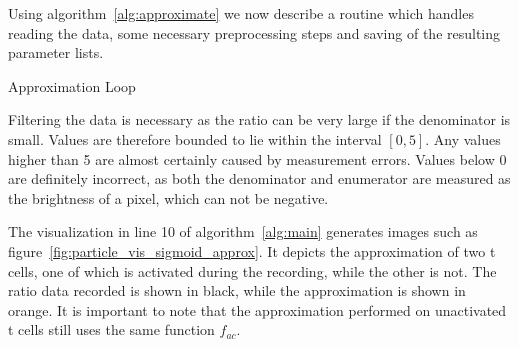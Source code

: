 Using algorithm~\ref{alg:approximate} we now describe a routine which handles reading the data, some necessary preprocessing steps and saving of the resulting parameter lists.
\newpage

\begin{algorithm}[H] \label{alg:main}
	\SetAlgoLined
	\DontPrintSemicolon
	\LinesNumbered
	\caption{Approximation Loop}
	
	
	\BlankLine
\end{algorithm}
\vspace{1cm}

Filtering the data is necessary as the ratio can be very large if the denominator is small. Values are therefore bounded to lie within the interval $[0, 5]$. Any values higher than 5 are almost certainly caused by measurement errors. Values below 0 are definitely incorrect, as both the denominator and enumerator are measured as the brightness of a pixel, which can not be negative.

The visualization in line 10 of algorithm~\ref{alg:main} generates images such as figure~\ref{fig:particle_vis_sigmoid_approx}. It depicts the approximation of two t cells, one of which is activated during the recording, while the other is not. The ratio data recorded is shown in black, while the approximation is shown in orange. It is important to note that the approximation performed on unactivated t cells still uses the same function $f_{ac}$.

